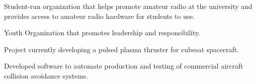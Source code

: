 \documentclass[letterpaper,ddMMMyyyy,nonstopmode]{simpleresumecv}
\begin{document}
\begin{Body}

            \begin{Description}
                Student-run organization that helps promote amateur radio at the university and provides access to amateur radio hardware for students to use.

            \end{Description}

            \Gap

            \begin{Description}
                    Youth Organization that promotes leadership and responsibility.
            \end{Description}




            \begin{Description}
                Project currently developing a pulsed plasma thruster for cubesat spacecraft.
            \end{Description}



                \begin{Description}
                    Developed software to automate production and testing of commercial aircraft collision avoidance systems.
                \end{Description}
            \Gap



\end{Body}
\end{document}
